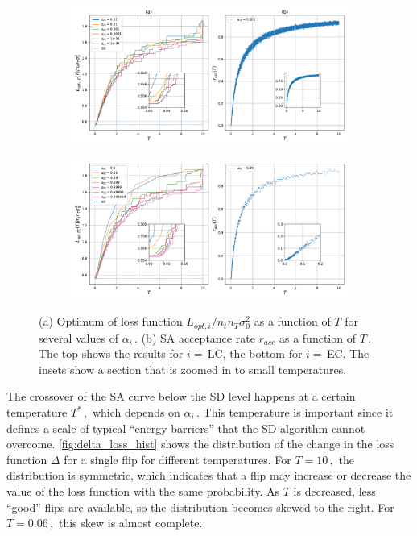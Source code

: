 \documentclass[bachelor,       %
               oneside,        %
               BCOR10mm,       %
               ngerman, english %
               ]{GAUBM}
\begin{document}
\begin{figure}[H]
\centering
\begin{subfigure}[b]{\textwidth}
\includegraphics[width=1\linewidth]{figures/opt_T_lam1p25_dphi0.5_seed0_lin_cool.pdf}
   \label{fig:opt-t-lin-cool} 
\end{subfigure}

\begin{subfigure}[b]{\textwidth}
   \includegraphics[width=1\linewidth]{figures/opt_T_lam1p25_dphi0.5_seed0_exp_cool.pdf}
   \label{fig:opt-t-texp-cool}
\end{subfigure}
\caption{(a) Optimum of loss function $L_{opt,i}/n_tn_T\sigma_0^2$ as a function of $T$ for several values of $\alpha_i\,.$ (b) \ac{SA} acceptance rate $r_{acc}$ as a function of $T\,.$ The top shows the results for $i=\,$\ac{LC}, the bottom for $i=\,$\ac{EC}. The insets show a section that is zoomed in to small temperatures.}
\label{fig:opt-t}
\end{figure}

The crossover of the \ac{SA} curve below the \ac{SD} level happens at a certain temperature $T^*\,,$ which depends on $\alpha_i\,.$ This temperature is important since it defines a scale of typical \enquote{energy barriers} that the \ac{SD} algorithm cannot overcome. \autoref{fig:delta_loss_hist} shows the distribution of the change in the loss function $\Delta$ for a single flip for different temperatures. For $T=10\,,$ the distribution is symmetric, which indicates that a flip may increase or decrease the value of the loss function with the same probability. As $T$ is decreased, less \enquote{good} flips are available, so the distribution becomes skewed to the right. For $T=0.06\,,$ this skew is almost complete.
\end{document}
